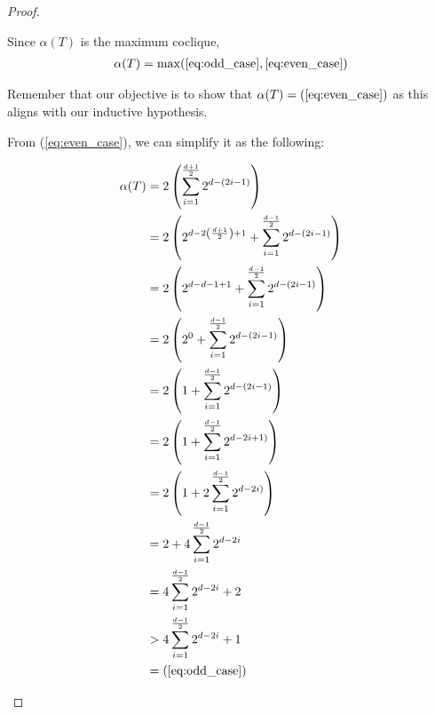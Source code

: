 \documentclass{article}
\theoremstyle{definition}
\begin{document}
\begin{proof}
\begin{caseof}
\begin{subcaseof}
		\end{subcaseof}

		Since $\alpha(T)$ is the maximum coclique,
		\begin{align*}
			\alpha(T) = \max(\ref{eq:odd_case}, \ref{eq:even_case})
		\end{align*}

		Remember that our objective is to show that $\alpha(T) = (\ref{eq:even_case})$ as this aligns with our inductive hypothesis.

		From (\ref{eq:even_case}), we can simplify it as the following:

		\begin{align*}
			\alpha(T) & = 2\left(\displaystyle\sum_{i = 1}^{\frac{d + 1}{2}}2^{d - (2i - 1)}\right)                                             \\
			          & = 2\left(2^{d - 2\left(\frac{d + 1}{2}\right) + 1} + \displaystyle\sum_{i = 1}^{\frac{d - 1}{2}}2^{d - (2i - 1)}\right) \\
			          & = 2\left(2^{d - d - 1 + 1} + \displaystyle\sum_{i = 1}^{\frac{d - 1}{2}}2^{d - (2i - 1)}\right)                         \\
			          & = 2\left(2^0 + \displaystyle\sum_{i = 1}^{\frac{d - 1}{2}}2^{d - (2i - 1)}\right)                                       \\
			          & = 2\left(1 + \displaystyle\sum_{i = 1}^{\frac{d - 1}{2}}2^{d - (2i - 1)}\right)                                         \\
			          & = 2\left(1 + \displaystyle\sum_{i = 1}^{\frac{d - 1}{2}}2^{d - 2i + 1)}\right)                                          \\
			          & = 2\left(1 + 2\displaystyle\sum_{i = 1}^{\frac{d - 1}{2}}2^{d - 2i)}\right)                                             \\
			          & = 2 + 4\displaystyle\sum_{i = 1}^{\frac{d - 1}{2}}2^{d - 2i}                                                            \\
			          & = 4\displaystyle\sum_{i = 1}^{\frac{d - 1}{2}}2^{d - 2i} + 2                                                            \\
			          & > 4\displaystyle\sum_{i = 1}^{\frac{d - 1}{2}}2^{d - 2i} + 1                                                            \\
			          & = (\ref{eq:odd_case})
		\end{align*}


\end{caseof}
\end{proof}
\end{document}
